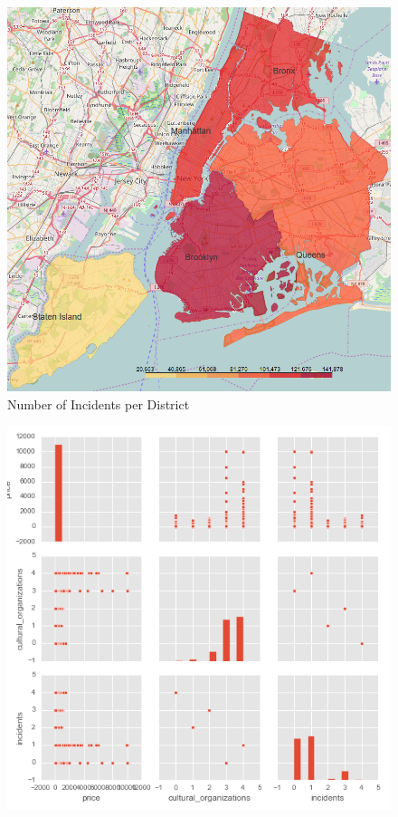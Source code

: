 \documentclass[sigconf]{acmart}
\begin{document}
\begin{figure}[!htpb]
	\centering
	\includegraphics[width=\linewidth]{images/incidents_per_district}
	\caption{Number of Incidents per District}
	\label{fig:jamesPf}
\end{figure}

\begin{figure}[!htpb]
	\centering
	\includegraphics[width=\linewidth]{images/pairwise_relations_principal_features}
	\caption{}
	\label{fig:pairwiserelationsprincipalfeatures}
\end{figure}
\end{document}
